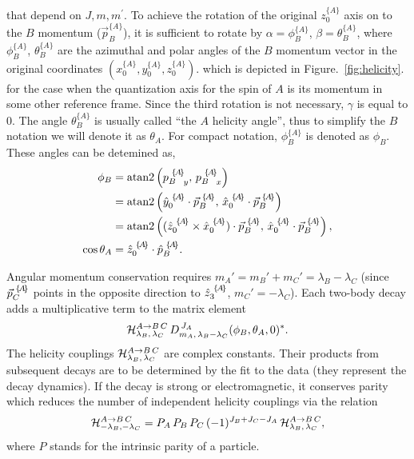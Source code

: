 that depend on $J,m,m^{'}$.
To achieve the rotation of the original $z_{0}^{\{A\}}$ axis on to the $B$ momentum ($\vec{p}_{B}^{\{A\}}$),
it is sufficient to rotate by $\alpha=\phi_{B}^{\{A\}}$, $\beta =\theta_{B}^{\{A\}}$,
where $\phi_{B}^{\{A\}}$, $\theta_{B}^{\{A\}}$ are the azimuthal and polar angles of the $B$ momentum vector in the original coordinates
\ie $(x_{0}^{\{A\}}, y_{0}^{\{A\}}, z_{0}^{\{A\}})$.
which is depicted in Figure.~\ref{fig:helicity}.
for the case when the quantization axis for the spin of $A$ is its momentum in some other reference frame. 
Since the third rotation is not necessary, 
$\gamma$ is equal to $0$. 
The angle $\theta_{B}^{\{A\}}$ is usually called “the $A$ helicity angle”, 
thus to simplify the $B$ notation we will denote it as $\theta_{A}$. 
For compact notation, 
$\phi_{B}^{\{A\}}$ is denoted as $\phi_{B}$.
These angles can be detemined as,
\begin{align}
\phi_B & =  {\rm atan2}\left( {\BA{p}{B}{A}}_{\!y},\,{\BA{p}{B}{A}}_{\!x} \right) \notag\\
       & =  {\rm atan2}\left( \BA{\hat{y}}{0}{A} \cdot\BA{\vec{p}}{B}{A} ,\, \BA{\hat{x}}{0}{A}\cdot\BA{\vec{p}}{B}{A} \right) \notag\\
       & =  {\rm atan2}\left( (\BA{\hat{z}}{0}{A} \times\BA{\hat{x}}{0}{A}) \cdot\BA{\vec{p}}{B}{A} ,\, \BA{\hat{x}}{0}{A} \cdot \BA{\vec{p}}{B}{A} \right),
   \label{SUPeq:ph}\\
\cos\theta_A & = \BA{\hat{z}}{0}{A} \cdot \BA{\hat{p}}{B}{A}. \label{SUPeq:theta} 
\end{align}

Angular momentum conservation requires $m_A'=m_B'+m_C'=\lambda_B - \lambda_C$
(since ${\vec{p}}_{{C}}^{\,\,\{\!A\!\}}$ points in the opposite direction to ${\hat{z}}_{{3}}^{\,\,\{\!A\!\}}$, $m_C'=-\lambda_C$).
Each two-body decay adds a multiplicative term to the matrix element
\begin{equation}
 {\cal H}_{\lambda_B,\,\lambda_C}^{A\rightarrow B\,C}\,D^{\,J_A}_{m_A,\,\lambda_B-\lambda_C}(\phi_B,\theta_A,0)^*.
\label{SUPeq:ABCterm}
\end{equation}
The helicity couplings ${\cal H}_{\lambda_B,\,\lambda_C}^{A\rightarrow B\,C}$ are complex constants.
Their products from subsequent decays are to be determined by the fit to the data
(they represent the decay dynamics).
If the decay is strong or electromagnetic, 
it conserves parity which reduces the number of independent helicity couplings via the relation\begin{equation}
{\cal H}_{-\lambda_B,-\lambda_C}^{A\rightarrow B\,C} = P_A\,P_B\,P_C\,(-1)^{J_B+J_C-J_A}\, {\cal H}_{\lambda_B,\,\lambda_C}^{A\rightarrow B\,C},
\label{SUPeq:parity}
\end{equation}
where $P$ stands for the intrinsic parity of a particle. 

